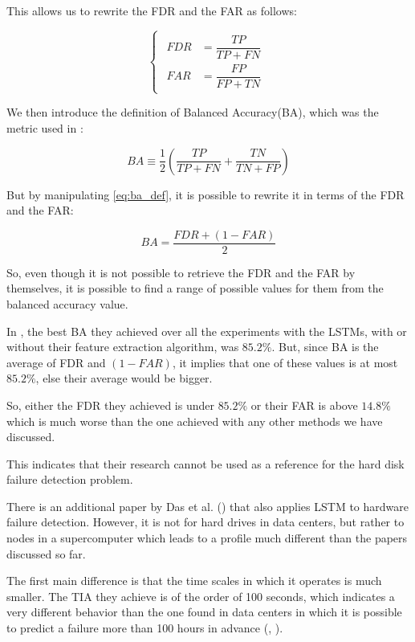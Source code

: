 This allows us to rewrite the FDR and the FAR as follows:

\begin{equation}
    \begin{cases}
        \begin{aligned}
            FDR &= \dfrac{TP}{TP + FN} \\
            FAR &= \dfrac{FP}{FP + TN}
        \end{aligned}
    \end{cases}
\end{equation}

We then introduce the definition of Balanced Accuracy(BA), which was the metric used in \cite{zhang2017deep}:

\begin{equation}\label{eq:ba_def}
    BA \equiv \dfrac{1}{2}\left(\dfrac{TP}{TP + FN} + \dfrac{TN}{TN + FP}\right)
\end{equation}

But by manipulating \ref{eq:ba_def}, it is possible to rewrite it in terms of the FDR and the FAR:

\begin{equation}
    BA = \dfrac{FDR + (1-FAR)}{2}
\end{equation}

So, even though it is not possible to retrieve the FDR and the FAR by themselves, it is possible to find a range of possible values for them from the balanced accuracy value.

In \cite{zhang2017deep}, the best BA they achieved over all the experiments with the LSTMs, with or without their feature extraction algorithm, was $85.2\%$.
But, since BA is the average of FDR and $(1-FAR)$, it implies that one of these values is at most $85.2\%$, else their average would be bigger.

So, either the FDR they achieved is under $85.2\%$ or their FAR is above $14.8\%$ which is much worse than the one achieved with any other methods we have discussed.

This indicates that their research cannot be used as a reference for the hard disk failure detection problem.

There is an additional paper by Das et al. (\cite{das2018desh}) that also applies LSTM to hardware failure detection.
However, it is not for hard drives in data centers, but rather to nodes in a supercomputer which leads to a profile much different than the papers discussed so far.

The first main difference is that the time scales in which it operates is much smaller.
The TIA they achieve is of the order of 100 seconds, which indicates a very different behavior than the one found in data centers in which it is possible to predict a failure more than 100 hours in advance (\cite{Li14}, \cite{Zhu13}).

